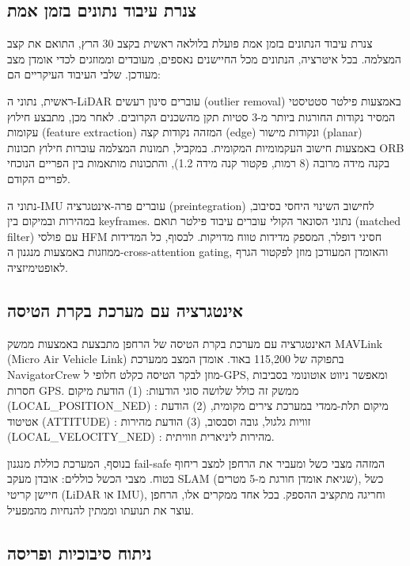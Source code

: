 \subsection{צנרת עיבוד נתונים בזמן אמת}
\label{sec:ch07_pipeline}

צנרת עיבוד הנתונים בזמן אמת פועלת בלולאה ראשית בקצב 30 הרץ, התואם את קצב המצלמה. בכל איטרציה, הנתונים מכל החיישנים נאספים, מעובדים וממוזגים לכדי אומדן מצב מעודכן. שלבי העיבוד העיקריים הם:

ראשית, נתוני ה-LiDAR עוברים סינון רעשים (outlier removal) באמצעות פילטר סטטיסטי המסיר נקודות החורגות ביותר מ-3 סטיות תקן מהשכנים הקרובים. לאחר מכן, מתבצע חילוץ עקומות (feature extraction) המזהה נקודות קצה (edge) ונקודות מישור (planar) באמצעות חישוב העקמומיות המקומית. במקביל, תמונות המצלמה עוברות חילוץ תכונות ORB בקנה מידה מרובה (8 רמות, פקטור קנה מידה 1.2), והתכונות מותאמות בין הפריים הנוכחי לפריים הקודם.

נתוני ה-IMU עוברים פרה-אינטגרציה (preintegration) לחישוב השינוי היחסי בסיבוב, במהירות ובמיקום בין keyframes. נתוני הסונאר הקולי עוברים עיבוד פילטר תואם (matched filter) עם פולסי HFM חסיני דופלר, המספק מדידות טווח מדויקות. לבסוף, כל המדידות ממוזגות באמצעות מנגנון ה-cross-attention gating, והאומדן המעודכן מוזן לפקטור הגרף לאופטימיזציה.

\subsection{אינטגרציה עם מערכת בקרת הטיסה}
\label{sec:ch07_flight_control}

האינטגרציה עם מערכת בקרת הטיסה של הרחפן מתבצעת באמצעות ממשק MAVLink (Micro Air Vehicle Link) בתפוקה של 115,200 באוד. אומדן המצב ממערכת NavigatorCrew מוזן לבקר הטיסה כקלט חלופי ל-GPS, ומאפשר ניווט אוטונומי בסביבות חסרות GPS. ממשק זה כולל שלושה סוגי הודעות: (1) הודעת מיקום (LOCAL_POSITION_NED) : מיקום תלת-ממדי במערכת צירים מקומית, (2) הודעת אטיטוד (ATTITUDE) : זוויות גלגול, גובה וסבסוב, (3) הודעת מהירות (LOCAL_VELOCITY_NED) : מהירות ליניארית וזוויתית.

בנוסף, המערכת כוללת מנגנון fail-safe המזהה מצבי כשל ומעביר את הרחפן למצב ריחוף בטוח. מצבי הכשל כוללים: אובדן מעקב SLAM (שגיאת אומדן חורגת מ-5 מטרים), כשל חיישן קריטי (LiDAR או IMU), וחריגה מתקציב ההספק. בכל אחד ממקרים אלו, הרחפן עוצר את תנועתו וממתין להנחיות מהמפעיל.

\subsection{ניתוח סיבוכיות ופריסה}
\label{sec:ch07_complexity}


